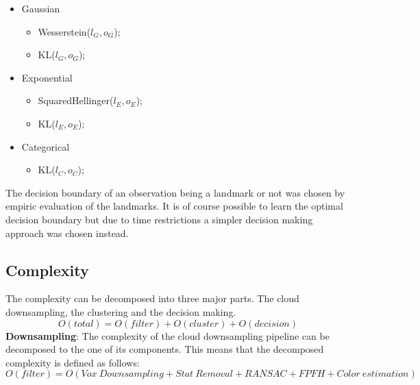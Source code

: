 \documentclass[twoside,hidelinks]{article}
\begin{document}
\begin{itemize}
	\item Gaussian 
		\begin{itemize}
			\item Wesserstein($l_G,o_G$);			
			\item KL($l_G,o_G$);
		\end{itemize}
	\item Exponential
			\begin{itemize}
				\item SquaredHellinger($l_E,o_E$);
				\item KL($l_E,o_E$);
			\end{itemize}
	\item Categorical
			\begin{itemize}
				\item KL($l_C,o_C$);
			\end{itemize}

\end{itemize}

The decision boundary of an observation being a landmark or not was chosen by empiric evaluation of the landmarks. It is of course possible to learn the optimal decision boundary but due to time restrictions a simpler decision making approach was chosen instead.


\subsection{Complexity}

The complexity can be decomposed into three major parts. The cloud downsampling, the clustering and the decision making.
$$
O(total) = O(filter) + O(cluster) + O(decision)
$$
\textbf{Downsampling}: The complexity of the cloud downsampling pipeline can be decomposed to the one of its components. This means that the decomposed complexity is defined as follows:
$$O(filter) = O(Vox\ Downsampling + Stat\ Removal + RANSAC+ FPFH + Color\ estimation) $$
\end{document}
